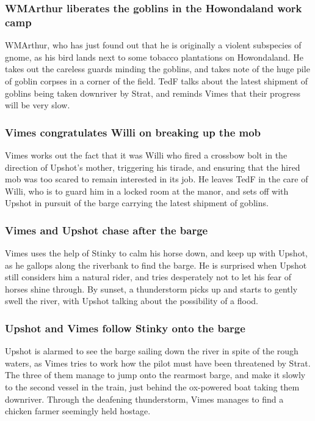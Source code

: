 \subsubsection{\Gls{WMArthur} liberates the goblins in the Howondaland work camp}
\Gls{WMArthur}, who has just found out that he is originally a violent subspecies of gnome, as his
bird lands next to some tobacco plantations on Howondaland. He takes out the careless guards
minding the goblins, and takes note of the huge pile of goblin corpses in a corner of the field.
\Gls{TedF} talks about the latest shipment of goblins being taken downriver by \Gls{Strat}, and
reminds \Gls{Vimes} that their progress will be very slow.

\subsubsection{\Gls{Vimes} congratulates \Gls{Willi} on breaking up the mob}
\Gls{Vimes} works out the fact that it was \Gls{Willi} who fired a crossbow bolt in the direction
of \Gls{Upshot}'s mother, triggering his tirade, and ensuring that the hired mob was too scared to
remain interested in its job. He leaves \Gls{TedF} in the care of \Gls{Willi}, who is to guard him
in a locked room at the manor, and sets off with \Gls{Upshot} in pursuit of the barge carrying the
latest shipment of goblins.

\subsubsection{\Gls{Vimes} and \Gls{Upshot} chase after the barge}
\Gls{Vimes} uses the help of \Gls{Stinky} to calm his horse down, and keep up with \Gls{Upshot},
as he gallops along the riverbank to find the barge. He is surprised when \Gls{Upshot} still
considers him a natural rider, and tries desperately not to let his fear of horses shine through.
By sunset, a thunderstorm picks up and starts to gently swell the river, with \Gls{Upshot} talking
about the possibility of a flood.

\subsubsection{\Gls{Upshot} and \Gls{Vimes} follow \Gls{Stinky} onto the barge}
\Gls{Upshot} is alarmed to see the barge sailing down the river in spite of the rough waters, as
\Gls{Vimes} tries to work how the pilot must have been threatened by \Gls{Strat}. The three of them
manage to jump onto the rearmost barge, and make it slowly to the second vessel in the train, just
behind the ox-powered boat taking them downriver. Through the deafening thunderstorm, \Gls{Vimes}
manages to find a chicken farmer seemingly held hostage.

